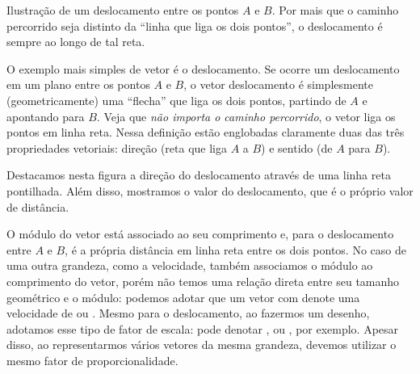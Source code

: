 \begin{marginfigure}
\centering
{}
\caption{Ilustração de um deslocamento entre os pontos $A$ e $B$. Por mais que o caminho percorrido seja distinto da ``linha que liga os dois pontos'', o deslocamento é sempre ao longo de tal reta.}
\end{marginfigure}

O exemplo mais simples de vetor é o deslocamento. Se ocorre um deslocamento em um plano entre os pontos $A$ e $B$, o vetor deslocamento é simplesmente (geometricamente) uma ``flecha'' que liga os dois pontos, partindo de $A$ e apontando para $B$. Veja que \emph{não importa o caminho percorrido}, o vetor liga os pontos em linha reta. Nessa definição estão englobadas claramente duas das três propriedades vetoriais: direção (reta que liga $A$ a $B$) e sentido (de $A$ para $B$). 

\begin{marginfigure}
\centering
{}
\caption{Destacamos nesta figura a direção do deslocamento através de uma linha reta pontilhada. Além disso, mostramos o valor do deslocamento, que é o próprio valor de distância.}
\end{marginfigure}

O módulo do vetor está associado ao seu comprimento e, para o deslocamento entre $A$ e $B$, é a própria distância em linha reta entre os dois pontos. No caso de uma outra grandeza, como a velocidade, também associamos o módulo ao comprimento do vetor, porém não temos uma relação direta entre seu tamanho geométrico e o módulo: podemos adotar que um vetor com  denote uma velocidade de  ou . Mesmo para o deslocamento, ao fazermos um desenho, adotamos esse tipo de fator de escala:  pode denotar , ou , por exemplo. Apesar disso, ao representarmos vários vetores da mesma grandeza, devemos utilizar o mesmo fator de proporcionalidade.

